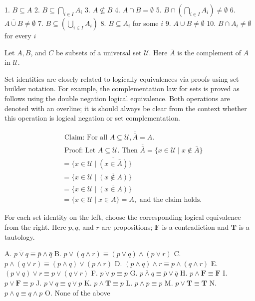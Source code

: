 \begin{enumerate}
1. $B \subseteq A$
2. $B \subseteq \bigcap_{i \in I} A_i$
3. $A \nsubseteq B$
4. $A \cap B=\emptyset$
5. $B \cap\left(\bigcap_{i \in I} A_i\right) \neq \emptyset$
6. $\overline{A \cup B} \neq \emptyset$
7. $B \subseteq\left(\bigcup_{i \in I} A_i\right)$
8. $B \subseteq A_i$ for some $i$
9. $A \cup B \neq \emptyset$
10. $B \cap A_i \neq \emptyset$ for every $i$



















Let $A, B$, and $C$ be subsets of a universal set $\mathcal{U}$. Here $\bar{A}$ is the complement of $A$ in $\mathcal{U}$.

Set identities are closely related to logically equivalences via proofs using set builder notation. For example, the complementation law for sets is proved as follows using the double negation logical equivalence.
Both operations are denoted with an overline; it is should always be clear from the context whether this operation is logical negation or set complementation.

$$
\begin{aligned}
& \text { Claim: For all } A \subseteq \mathcal{U}, \overline{\bar{A}}=A . \\
& \text { Proof: Let } A \subseteq \mathcal{U} . \text { Then } \overline{\bar{A}}=\{x \in \mathcal{U} \mid x \notin \bar{A}\} \\
& =\{x \in \mathcal{U} \mid \overline{(x \in \bar{A})}\} \\
& =\{x \in \mathcal{U} \mid \overline{(x \notin A)}\} \\
& =\{x \in \mathcal{U} \mid \overline{(x \in A)}\} \\
& =\{x \in \mathcal{U} \mid x \in A\}=A, \text { and the claim holds. }
\end{aligned}
$$

For each set identity on the left, choose the corresponding logical equivalence from the right. Here $p, q$, and $r$ are propositions; $\boldsymbol{F}$ is a contradiction and $\boldsymbol{T}$ is a tautology.

A. $\overline{p \vee q} \equiv \bar{p} \wedge \bar{q}$
B. $p \vee(q \wedge r) \equiv(p \vee q) \wedge(p \vee r)$
C. $p \wedge(q \vee r) \equiv(p \wedge q) \vee(p \wedge r)$
D. $(p \wedge q) \wedge r \equiv p \wedge(q \wedge r)$
E. $(p \vee q) \vee r \equiv p \vee(q \vee r)$
F. $p \vee p \equiv p$
G. $\overline{p \wedge q} \equiv \bar{p} \vee \bar{q}$
H. $p \wedge \boldsymbol{F} \equiv \boldsymbol{F}$
I. $p \vee \boldsymbol{F} \equiv p$
J. $p \vee q \equiv q \vee p$
K. $p \wedge \boldsymbol{T} \equiv p$
L. $p \wedge p \equiv p$
M. $p \vee \boldsymbol{T} \equiv \boldsymbol{T}$
N. $p \wedge q \equiv q \wedge p$
O. None of the above




\end{enumerate}
